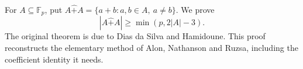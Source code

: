For $A\subseteq\mathbb F_p$, put $A\hat+ A=\{a+b:a,b\in A,\ a\ne b\}$. We prove
\[|A\hat+ A|\ge\min(p,2|A|-3).\]
The original theorem is due to Dias da Silva and Hamidoune. This proof reconstructs the elementary method of Alon, Nathanson and Ruzsa, including the coefficient identity it needs.
